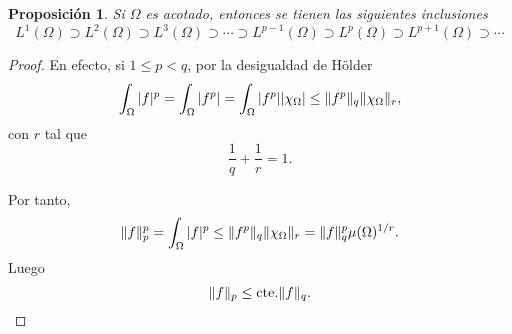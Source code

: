 \documentclass[12pt,a4paper]{book}
\DeclarePairedDelimiter\norm{\lVert}{\rVert}
\newtheorem{prop}[thm]{Proposición}
\theoremstyle{definition} \newtheorem{defn}[thm]{Definición}
\theoremstyle{definition} \newtheorem{ejemplo}[thm]{Ejemplo}
\theoremstyle{definition} \newtheorem{ejercicio}[thm]{Ejercicio}
\theoremstyle{remark} \newtheorem*{obs}{Observación}
\newcommand{\cte}{\mathrm{cte.}}
\begin{document}
\begin{prop}
  Si $\Omega$ es acotado, entonces se tienen las siguientes inclusiones
  \begin{equation*}
    L^1(\Omega) \supset L^2(\Omega) \supset L^3(\Omega) \supset \cdots \supset L^{p-1}(\Omega) \supset L^{p}(\Omega) \supset L^{p+1}(\Omega) \supset \cdots
  \end{equation*}
\end{prop}

\begin{proof}
  En efecto, si $1\leq p < q$, por la desigualdad de Hölder
  \begin{equation*}
    \int_{\Omega} |f|^p=\int_{\Omega} |f^p| = \int_{\Omega} |f^p| |\chi_\Omega| \leq \norm{f^p}_q \norm{\chi_\Omega}_r,
  \end{equation*}
  con $r$ tal que
  \begin{equation*}
    \frac{1}{q}+\frac{1}{r}=1.
  \end{equation*}

  Por tanto, 
  \begin{equation*}
    \norm{f}_p^p=\int_{\Omega} |f|^p\leq \norm{f^p}_q \norm{\chi_\Omega}_r =\norm{f}_q^p \mu(\Omega)^{1/r}.
  \end{equation*}
  Luego
  \begin{equation*}
    \norm{f}_p \leq \cte \norm{f}_q.
  \end{equation*}
  
\end{proof}
\end{document}
